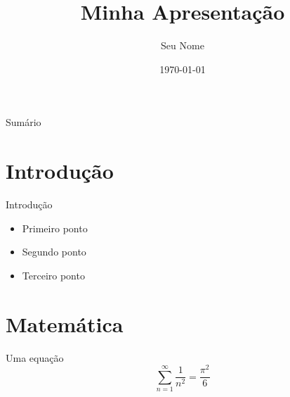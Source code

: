 \documentclass{beamer}
\title{Minha Apresentação}
\author{Seu Nome}
\date{\today}
\begin{document}
\frame{\titlepage}

\begin{frame}{Sumário}
  \tableofcontents
\end{frame}

\section{Introdução}
\begin{frame}{Introdução}
  \begin{itemize}
    \item<1-> Primeiro ponto
    \item<2-> Segundo ponto
    \item<3-> Terceiro ponto
  \end{itemize}
\end{frame}

\section{Matemática}
\begin{frame}{Uma equação}
  \[ \sum_{n=1}^{\infty} \frac{1}{n^2} = \frac{\pi^2}{6} \]
\end{frame}
\end{document}
